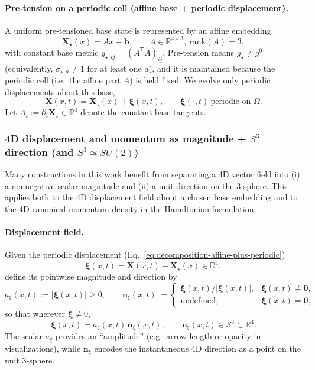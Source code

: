 \paragraph{Pre-tension on a periodic cell (affine base + periodic displacement).}
A uniform pre-tensioned base state is represented by an affine embedding
\begin{equation}
  \mathbf X_\star(x)=A x+\mathbf b,
  \qquad A\in\mathbb R^{4\times 3},\ \mathrm{rank}(A)=3,
  \label{eq:affine-base-embedding}
\end{equation}
with constant base metric $g_{\star,ij}=(A^\mathsf T A)_{ij}$.
Pre-tension means $g_\star\neq g^0$ (equivalently, $\sigma_{\star,a}\neq 1$ for at least one $a$),
and it is maintained because the periodic cell (i.e.\ the affine part $A$) is held fixed.
We evolve only periodic displacements about this base,
\begin{equation}
  \mathbf X(x,t)=\mathbf X_\star(x)+\boldsymbol\xi(x,t),
  \qquad \boldsymbol\xi(\cdot,t)\ \text{periodic on }\Omega.
  \label{eq:decomposition-affine-plus-periodic}
\end{equation}
Let $A_i:=\partial_i\mathbf X_\star\in\mathbb R^4$ denote the constant base tangents.

\subsubsection{4D displacement and momentum as magnitude + $S^3$ direction (and $S^3\simeq SU(2)$)}
\label{sec:s3-su2-decomposition}

Many constructions in this work benefit from separating a 4D vector
field into (i) a nonnegative scalar magnitude and (ii) a unit direction on the
3-sphere. This applies both to the 4D displacement field about a chosen base
embedding and to the 4D canonical momentum density in the Hamiltonian
formulation.

\paragraph{Displacement field.}
Given the periodic displacement (Eq.~\eqref{eq:decomposition-affine-plus-periodic})
\[
\boldsymbol\xi(x,t)=\mathbf X(x,t)-\mathbf X_\star(x)\in\mathbb R^4,
\]
define its pointwise magnitude and direction by
\begin{equation}
  a_\xi(x,t) := |\boldsymbol\xi(x,t)| \ge 0,
  \qquad
  \mathbf n_\xi(x,t) :=
  \begin{cases}
    \boldsymbol\xi(x,t)/|\boldsymbol\xi(x,t)|, & \boldsymbol\xi(x,t)\neq \mathbf 0,\\
    \text{undefined}, & \boldsymbol\xi(x,t)=\mathbf 0,
  \end{cases}
  \label{eq:xi-amplitude-direction}
\end{equation}
so that wherever $\boldsymbol\xi\neq 0$,
\begin{equation}
  \boldsymbol\xi(x,t) = a_\xi(x,t)\,\mathbf n_\xi(x,t),
  \qquad
  \mathbf n_\xi(x,t)\in S^3\subset\mathbb R^4.
  \label{eq:xi-factorization}
\end{equation}
The scalar $a_\xi$ provides an ``amplitude'' (e.g.\ arrow length or opacity in
visualizations), while $\mathbf n_\xi$ encodes the instantaneous 4D direction as
a point on the unit 3-sphere.

